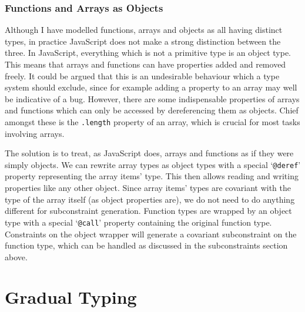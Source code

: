 \documentclass[12pt,a4paper,twoside,openright]{report}
\theoremstyle{definition}
\theoremstyle{dotless}
\newcommand*{\js}{\texttt}
\begin{document}
\subsubsection*{Functions and Arrays as Objects}

Although I have modelled functions, arrays and objects as all having distinct
types, in practice JavaScript does not make a strong distinction between the
three. In JavaScript, everything which is not a primitive type is an object
type. This means that arrays and functions can have properties added and
removed freely. It could be argued that this is an undesirable behaviour which
a type system should exclude, since for example adding a property to an array
may well be indicative of a bug. However, there are some indispensable
properties of arrays and functions which can only be accessed by dereferencing
them as objects. Chief amongst these is the \js{.length} property of an array,
which is crucial for most tasks involving arrays.

The solution is to treat, as JavaScript does, arrays and functions as if they
were simply objects. We can rewrite array types as object types with a special
`\texttt{@deref}' property representing the array items' type. This then allows
reading and writing properties like any other object. Since array items' types
are covariant with the type of the array itself (as object properties are), we
do not need to do anything different for subconstraint generation. Function
types are wrapped by an object type with a special `\texttt{@call}' property
containing the original function type. Constraints on the object wrapper will
generate a covariant subconstraint on the function type, which can be handled
as discussed in the subconstraints section above.

\newpage
\section{Gradual Typing}
\end{document}
